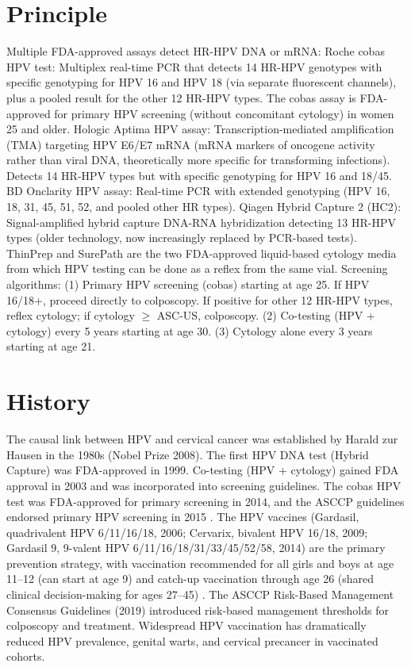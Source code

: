 \section*{Principle}
Multiple FDA-approved assays detect HR-HPV DNA or mRNA: Roche cobas HPV test: Multiplex real-time PCR that detects 14 HR-HPV genotypes with specific genotyping for HPV 16 and HPV 18 (via separate fluorescent channels), plus a pooled result for the other 12 HR-HPV types. The cobas assay is FDA-approved for primary HPV screening (without concomitant cytology) in women 25 and older. Hologic Aptima HPV assay: Transcription-mediated amplification (TMA) targeting HPV E6/E7 mRNA (mRNA markers of oncogene activity rather than viral DNA, theoretically more specific for transforming infections). Detects 14 HR-HPV types but with specific genotyping for HPV 16 and 18/45. BD Onclarity HPV assay: Real-time PCR with extended genotyping (HPV 16, 18, 31, 45, 51, 52, and pooled other HR types). Qiagen Hybrid Capture 2 (HC2): Signal-amplified hybrid capture DNA-RNA hybridization detecting 13 HR-HPV types (older technology, now increasingly replaced by PCR-based tests). ThinPrep and SurePath are the two FDA-approved liquid-based cytology media from which HPV testing can be done as a reflex from the same vial. Screening algorithms: (1) Primary HPV screening (cobas) starting at age 25. If HPV 16/18+, proceed directly to colposcopy. If positive for other 12 HR-HPV types, reflex cytology; if cytology $\geq$ ASC-US, colposcopy. (2) Co-testing (HPV + cytology) every 5 years starting at age 30. (3) Cytology alone every 3 years starting at age 21.

\section*{History}
The causal link between HPV and cervical cancer was established by Harald zur Hausen in the 1980s (Nobel Prize 2008). The first HPV DNA test (Hybrid Capture) was FDA-approved in 1999. Co-testing (HPV + cytology) gained FDA approval in 2003 and was incorporated into screening guidelines. The cobas HPV test was FDA-approved for primary screening in 2014, and the ASCCP guidelines endorsed primary HPV screening in 2015 \cite{huh2015use}. The HPV vaccines (Gardasil, quadrivalent HPV 6/11/16/18, 2006; Cervarix, bivalent HPV 16/18, 2009; Gardasil 9, 9-valent HPV 6/11/16/18/31/33/45/52/58, 2014) are the primary prevention strategy, with vaccination recommended for all girls and boys at age 11--12 (can start at age 9) and catch-up vaccination through age 26 (shared clinical decision-making for ages 27--45) \cite{markowitz2014human}. The ASCCP Risk-Based Management Consensus Guidelines (2019) introduced risk-based management thresholds for colposcopy and treatment. Widespread HPV vaccination has dramatically reduced HPV prevalence, genital warts, and cervical precancer in vaccinated cohorts.

